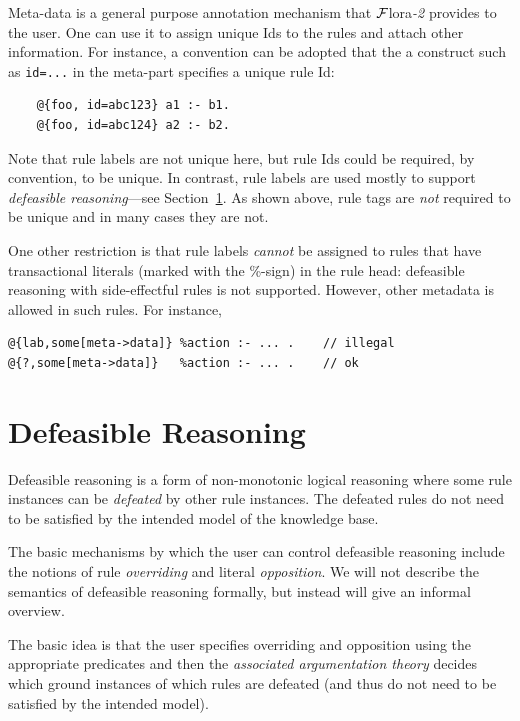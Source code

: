 \documentclass[11pt]{article}
\newcommand{\FLORA}{{\mbox{\sc ${\cal F}${lora}\rm\emph{-2}}}\xspace}
\begin{document}
Meta-data is a general purpose annotation mechanism that \FLORA provides to
the user. One can use it to assign unique Ids to the rules and attach other
information. For instance, a convention can be adopted that the a construct
such as {\tt id=...} in the meta-part specifies a unique rule Id:
\begin{verbatim}
    @{foo, id=abc123} a1 :- b1.
    @{foo, id=abc124} a2 :- b2.
\end{verbatim}
Note that rule labels are not unique here, but rule Ids could be required,
by convention, to be unique.
In contrast, rule labels are used mostly to support \emph{defeasible
  reasoning}---see Section~\ref{sec-defeasible}.  As shown above, rule
tags are \emph{not} required to be unique and in many cases they are
not. 

One other restriction is that
rule labels \emph{cannot} be assigned to rules that have
transactional literals (marked with the \%-sign) in the rule head:
defeasible reasoning with side-effectful rules is not supported.
However, other metadata is allowed in such rules.
For instance,
\begin{verbatim}
@{lab,some[meta->data]} %action :- ... .    // illegal
@{?,some[meta->data]}   %action :- ... .    // ok
\end{verbatim}


\section{Defeasible Reasoning}
\label{sec-defeasible}

Defeasible reasoning is a form of non-monotonic logical reasoning where
some rule instances can be \emph{defeated}  by other rule instances. The
defeated rules do not need to be satisfied by the intended model of the
knowledge base.

The basic mechanisms by which the user can control defeasible
reasoning include the notions of rule \emph{overriding} and literal
\emph{opposition}.  We will not describe the semantics of defeasible
reasoning formally, but instead will give an informal overview.

The basic idea is that the user specifies overriding and
opposition using the appropriate predicates and then the \emph{associated
argumentation theory} decides which ground instances of which rules are
defeated (and thus do not need to be satisfied by the intended model).  
\end{document}
